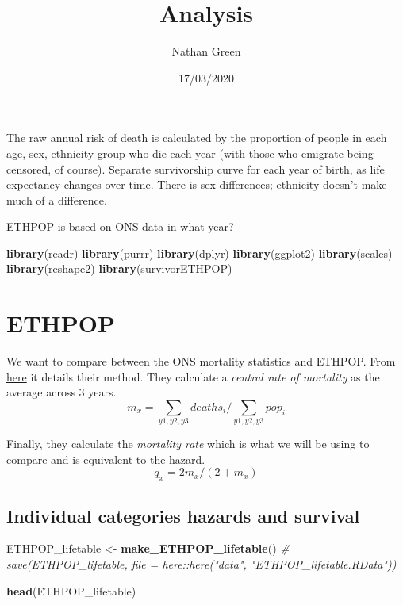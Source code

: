 \documentclass[
]{article}
\title{Analysis}
\author{Nathan Green}
\date{17/03/2020}
\newenvironment{Shaded}{\begin{snugshade}}{\end{snugshade}}
\newcommand{\CommentTok}[1]{\textcolor[rgb]{0.56,0.35,0.01}{\textit{#1}}}
\newcommand{\KeywordTok}[1]{\textcolor[rgb]{0.13,0.29,0.53}{\textbf{#1}}}
\newcommand{\NormalTok}[1]{#1}
\newcommand{\StringTok}[1]{\textcolor[rgb]{0.31,0.60,0.02}{#1}}
\begin{document}
\maketitle

The raw annual risk of death is calculated by the proportion of people
in each age, sex, ethnicity group who die each year (with those who
emigrate being censored, of course). Separate survivorship curve for
each year of birth, as life expectancy changes over time. There is sex
differences; ethnicity doesn't make much of a difference.

ETHPOP is based on ONS data in what year?

\begin{Shaded}
\begin{Highlighting}[]
\KeywordTok{library}\NormalTok{(readr)}
\KeywordTok{library}\NormalTok{(purrr)}
\KeywordTok{library}\NormalTok{(dplyr)}
\KeywordTok{library}\NormalTok{(ggplot2)}
\KeywordTok{library}\NormalTok{(scales)}
\KeywordTok{library}\NormalTok{(reshape2)}
\KeywordTok{library}\NormalTok{(survivorETHPOP)}
\end{Highlighting}
\end{Shaded}

\hypertarget{ethpop}{%
\section{ETHPOP}\label{ethpop}}

We want to compare between the ONS mortality statistics and ETHPOP. From
\href{https://www.ons.gov.uk/peoplepopulationandcommunity/healthandsocialcare/healthandlifeexpectancies/methodologies/guidetocalculatingnationallifetables}{here}
it details their method. They calculate a \emph{central rate of
mortality} as the average across 3 years. \[
m_x = \sum_{y1,y2,y3} deaths_i/ \sum_{y1,y2,y3} pop_i
\]

Finally, they calculate the \emph{mortality rate} which is what we will
be using to compare and is equivalent to the hazard. \[
q_x = 2 m_x/(2 + m_x)
\]

\hypertarget{individual-categories-hazards-and-survival}{%
\subsection{Individual categories hazards and
survival}\label{individual-categories-hazards-and-survival}}

\begin{Shaded}
\begin{Highlighting}[]
\NormalTok{ETHPOP_lifetable <-}\StringTok{ }\KeywordTok{make_ETHPOP_lifetable}\NormalTok{()}
\CommentTok{# save(ETHPOP_lifetable, file = here::here("data", "ETHPOP_lifetable.RData"))}


\KeywordTok{head}\NormalTok{(ETHPOP_lifetable)}
\end{Highlighting}
\end{Shaded}
\end{document}
